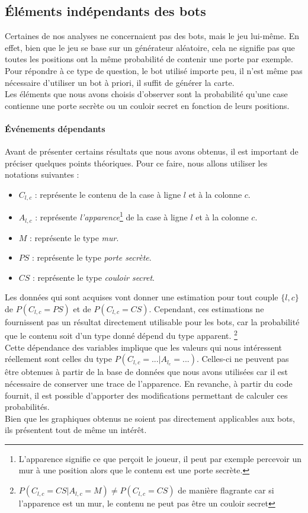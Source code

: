 \documentclass[a4paper,12pt]{article}
\begin{document}
\subsection{Éléments indépendants des bots}
Certaines de nos analyses ne concernaient pas des bots, mais le jeu lui-même. En
effet, bien que le jeu se base sur un générateur aléatoire, cela ne signifie pas
que toutes les positions ont la même probabilité de contenir une porte par
exemple. Pour répondre à ce type de question, le bot utilisé importe peu, il
n'est même pas nécessaire d'utiliser un bot à priori, il suffit de générer la
carte.
\\
Les éléments que nous avons choisis d'observer sont la probabilité qu'une case
contienne une porte secrète ou un couloir secret en fonction de leurs positions.

\paragraph{Événements dépendants}
Avant de présenter certains résultats que nous avons obtenus, il est important
de préciser quelques points théoriques. Pour ce faire, nous allons utiliser les
notations suivantes :
\begin{itemize}
\item $C_{l,c}$ :
  représente le contenu de la case à ligne $l$ et à la colonne $c$.
\item $A_{l,c}$ :
  représente {\em l'apparence}\footnote{L'apparence signifie ce que perçoit le
    joueur, il peut par exemple percevoir un mur à une position alors que le
    contenu est une porte secrète.} de la case à ligne $l$ et à la colonne $c$.
\item $M$ :
  représente le type {\em mur}.
\item $PS$ :
  représente le type {\em porte secrète}.
\item $CS$ :
  représente le type {\em couloir secret}.
\end{itemize}

Les données qui sont acquises vont donner une estimation pour tout couple
$\{l,c\}$ de $P(C_{l,c} = PS)$ et de $P(C_{l,c} = CS)$. Cependant, ces estimations
ne fournissent pas un résultat directement utilisable pour les bots, car la
probabilité que le contenu soit d'un type donné dépend du type apparent.
\footnote{$P(C_{l,c} = CS | A_{l,c} = M) \neq P(C_{l,c} = CS)$ de manière flagrante
  car si l'apparence est un mur, le contenu ne peut pas être un couloir secret}
\\
Cette dépendance des variables implique que les valeurs qui nous intéressent
réellement sont celles du type $P(C_{l,c} = ... | A_{l_c} = ...)$. Celles-ci ne
peuvent pas être obtenues à partir de la base de données que nous avons
utilisées car il est nécessaire de conserver une trace de l'apparence. En
revanche, à partir du code fournit, il est possible d'apporter des modifications
permettant de calculer ces probabilités.
\\
Bien que les graphiques obtenus ne soient pas directement applicables aux bots,
ils présentent tout de même un intérêt.
\end{document}
